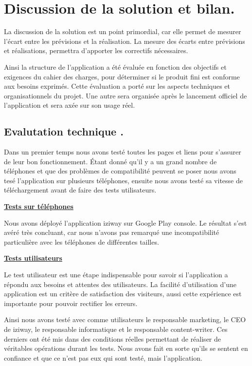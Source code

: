 \section{Discussion de la solution et bilan.}

La discussion de la solution est un point primordial, car elle permet de mesurer l’écart entre les prévisions et la réalisation. La mesure des écarts entre prévisions et réalisations, permettra d’apporter les correctifs nécessaires. 

Ainsi la structure de l’application a été évaluée en fonction des objectifs et exigences du cahier des charges, pour déterminer si le produit fini est conforme aux besoins exprimés. Cette évaluation a porté sur les aspects techniques et organisationnels du projet. Une autre sera organisée après le lancement officiel de l’application et sera axée sur son usage réel. 

\subsection{Evalutation technique .}

Dans un premier temps nous avons testé toutes les pages et liens pour s’assurer de leur bon fonctionnement. Étant donné qu’il y a un grand nombre de téléphones et que des problèmes de compatibilité peuvent se poser nous avons tesé l'application sur plusieurs téléphones, ensuite nous avons testé sa vitesse de téléchargement avant de faire des tests utilisateurs. 

\textbf{\underline{Tests sur téléphones}}

Nous avons déployé l’application iziway sur Google Play console. Le résultat s’est avéré très concluant, car nous n’avons pas remarqué une incompatibilité particulière avec les téléphones de différentes tailles.

\textbf{\underline{Tests utilisateurs}}

Le test utilisateur est une étape indispensable pour savoir si l’application a répondu aux besoins et attentes des utilisateurs. La facilité d’utilisation d’une application est un critère de satisfaction des visiteurs, aussi cette expérience est importante pour pouvoir rectifier les erreurs.

Ainsi nous avons testé avec comme utilisateurs le responsable marketing, le CEO de iziway, le responsable informatique et le responsable content-writer. Ces derniers ont été mis dans des conditions réelles permettant de réaliser de véritables opérations durant les tests. Nous avons fait en sorte qu’ils se sentent en confiance et que ce n’est pas eux qui sont testé, mais l’application.

